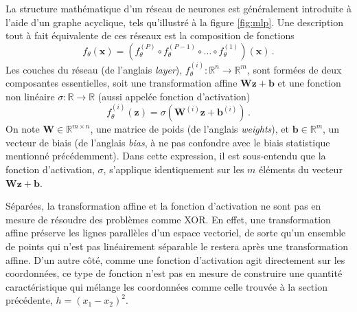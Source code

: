 La structure mathématique d'un réseau de neurones est généralement introduite à l'aide d'un graphe acyclique, 
tels qu'illustré à la figure \ref{fig:mlp}. Une description tout à fait équivalente de ces réseaux est la  
composition de fonctions
\begin{equation}\label{eq:composition}
        f_\theta(\mathbf{x}) = (f^{(P)}_\theta \circ f^{(P-1)}_\theta \circ \dots \circ f^{(1)}_\theta)(\mathbf{x})\, .
\end{equation} 
Les couches du réseau (de l'anglais \textit{layer}), $f_\theta^{(i)}: \mathbb{R}^{n} \rightarrow \mathbb{R}^{m}$, sont formées de deux composantes essentielles, 
soit une transformation affine $\mathbf{W}\mathbf{z} + \mathbf{b}$ et une fonction non linéaire $\sigma: \mathbb{R} \rightarrow  \mathbb{R}$ 
(aussi appelée fonction d'activation)
\begin{equation}\label{eq:mlp layer}
        f^{(i)}_\theta(\mathbf{z}) = \sigma( \mathbf{W}^{(i)} \mathbf{z} + \mathbf{b}^{(i)})\, .
\end{equation} 
On note $\mathbf{W} \in \mathbb{R}^{m \times n}$, une matrice de poids (de l'anglais \textit{weights}), et 
$\mathbf{b} \in \mathbb{R}^{m}$, un vecteur de biais (de l'anglais \textit{bias}, à ne pas confondre avec le biais statistique mentionné précédemment). 
Dans cette expression, il est sous-entendu que la fonction 
d'activation, $\sigma$, s'applique identiquement sur les $m$ éléments du vecteur $\mathbf{W} \mathbf{z} + \mathbf{b}$. 

Séparées, la transformation affine et la fonction d'activation ne sont pas en mesure de résoudre des problèmes comme XOR. En effet, 
une transformation affine préserve les lignes parallèles d'un espace vectoriel, de sorte 
qu'un ensemble de points qui n'est pas linéairement séparable le restera après une transformation affine. 
D'un autre côté, comme une fonction d'activation agit directement sur les coordonnées, ce type de fonction n'est 
pas en mesure de construire une quantité caractéristique qui mélange les coordonnées 
comme celle trouvée à la section précédente, $h = (x_1 - x_2)^{2}$. 

